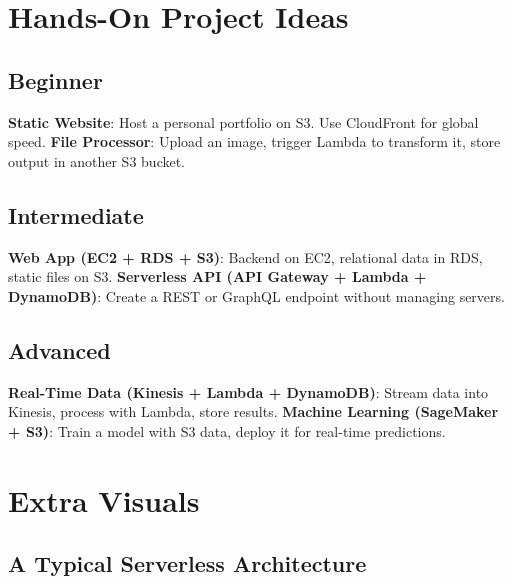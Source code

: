 \documentclass[12pt]{article}
\begin{document}
\section{Hands-On Project Ideas}
\justifying

\subsection{Beginner}
\textbf{Static Website}: Host a personal portfolio on S3. Use CloudFront for global speed.
\textbf{File Processor}: Upload an image, trigger Lambda to transform it, store output in another S3 bucket.

\subsection{Intermediate}
\textbf{Web App (EC2 + RDS + S3)}: Backend on EC2, relational data in RDS, static files on S3.
\textbf{Serverless API (API Gateway + Lambda + DynamoDB)}: Create a REST or GraphQL endpoint without managing servers.

\subsection{Advanced}
\textbf{Real-Time Data (Kinesis + Lambda + DynamoDB)}: Stream data into Kinesis, process with Lambda, store results.
\textbf{Machine Learning (SageMaker + S3)}: Train a model with S3 data, deploy it for real-time predictions.

\clearpage

\section{Extra Visuals}
\justifying

\subsection{A Typical Serverless Architecture}
\begin{center}
\end{center}
\end{document}
